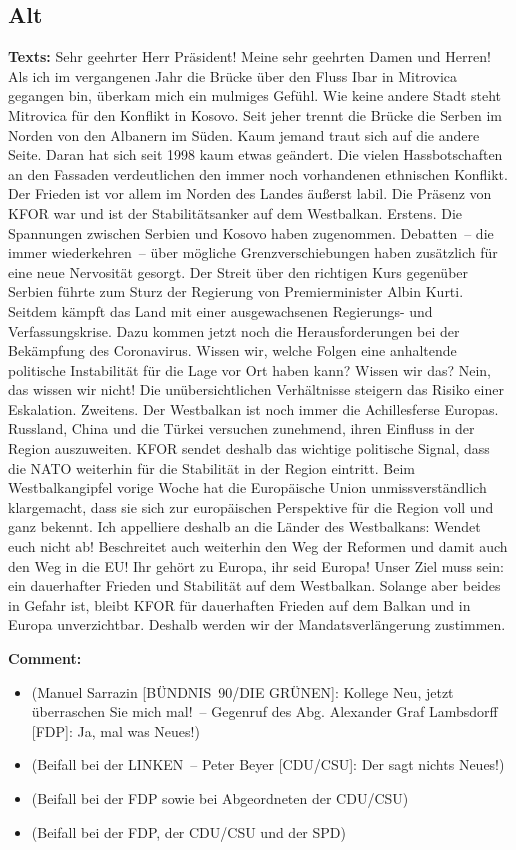 \documentclass{article}
\begin{document}
\subsection{Alt}
\noindent\textbf{Texts:} Sehr geehrter Herr Präsident! Meine sehr geehrten Damen und Herren! Als ich im vergangenen Jahr die Brücke über den Fluss Ibar in Mitrovica gegangen bin, überkam mich ein mulmiges Gefühl. Wie keine andere Stadt steht Mitrovica für den Konflikt in Kosovo. Seit jeher trennt die Brücke die Serben im Norden von den Albanern im Süden. Kaum jemand traut sich auf die andere Seite. Daran hat sich seit 1998 kaum etwas geändert. Die vielen Hassbotschaften an den Fassaden verdeutlichen den immer noch vorhandenen ethnischen Konflikt. Der Frieden ist vor allem im Norden des Landes äußerst labil. Die Präsenz von KFOR war und ist der Stabilitätsanker auf dem Westbalkan.  Erstens. Die Spannungen zwischen Serbien und Kosovo haben zugenommen. Debatten – die immer wiederkehren – über mögliche Grenzverschiebungen haben zusätzlich für eine neue Nervosität gesorgt. Der Streit über den richtigen Kurs gegenüber Serbien führte zum Sturz der Regierung von Premierminister Albin Kurti. Seitdem kämpft das Land mit einer ausgewachsenen Regierungs- und Verfassungskrise. Dazu kommen jetzt noch die Herausforderungen bei der Bekämpfung des Coronavirus. Wissen wir, welche Folgen eine anhaltende politische Instabilität für die Lage vor Ort haben kann? Wissen wir das? Nein, das wissen wir nicht! Die unübersichtlichen Verhältnisse steigern das Risiko einer Eskalation. Zweitens. Der Westbalkan ist noch immer die Achillesferse Europas. Russland, China und die Türkei versuchen zunehmend, ihren Einfluss in der Region auszuweiten. KFOR sendet deshalb das wichtige politische Signal, dass die NATO weiterhin für die Stabilität in der Region eintritt.  Beim Westbalkangipfel vorige Woche hat die Europäische Union unmissverständlich klargemacht, dass sie sich zur europäischen Perspektive für die Region voll und ganz bekennt. Ich appelliere deshalb an die Länder des Westbalkans: Wendet euch nicht ab! Beschreitet auch weiterhin den Weg der Reformen und damit auch den Weg in die EU! Ihr gehört zu Europa, ihr seid Europa! Unser Ziel muss sein: ein dauerhafter Frieden und Stabilität auf dem Westbalkan. Solange aber beides in Gefahr ist, bleibt KFOR für dauerhaften Frieden auf dem Balkan und in Europa unverzichtbar. Deshalb werden wir der Mandatsverlängerung zustimmen.   

\noindent\textbf{Comment:}
\begin{itemize}
    \setlength\itemsep{-3pt}
    \item (Manuel Sarrazin [BÜNDNIS 90/DIE GRÜNEN]: Kollege Neu, jetzt überraschen Sie mich mal! – Gegenruf des Abg. Alexander Graf Lambsdorff [FDP]: Ja, mal was Neues!)
    \setlength\itemsep{-3pt}
    \item (Beifall bei der LINKEN – Peter Beyer [CDU/CSU]: Der sagt nichts Neues!)
    \setlength\itemsep{-3pt}
    \item (Beifall bei der FDP sowie bei Abgeordneten der CDU/CSU)
    \setlength\itemsep{-3pt}
    \item (Beifall bei der FDP, der CDU/CSU und der SPD)
\end{itemize}
\end{document}
